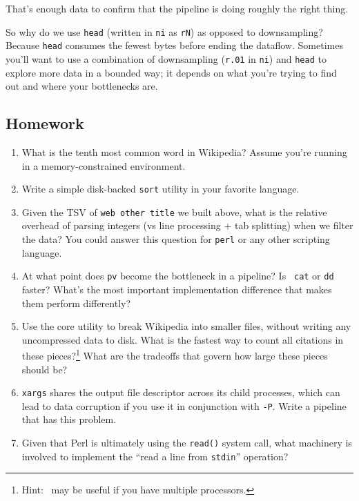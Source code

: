 That's enough data to confirm that the pipeline is doing roughly the right
thing.

So why do we use {\tt head} (written in {\tt ni} as {\tt rN}) as opposed to
downsampling? Because {\tt head} consumes the fewest bytes before ending the
dataflow. Sometimes you'll want to use a combination of downsampling ({\tt r.01}
in {\tt ni}) and {\tt head} to explore more data in a bounded way; it depends on
what you're trying to find out and where your bottlenecks are.

\subsection{Homework}
\begin{enumerate}
  \item What is the tenth most common word in Wikipedia? Assume you're running
        in a memory-constrained environment.
  \item Write a simple disk-backed {\tt sort} utility in your favorite language.
  \item Given the TSV of {\tt web other title} we built above, what is the
        relative overhead of parsing integers (vs line processing + tab
        splitting) when we filter the data? You could answer this question for
        {\tt perl} or any other scripting language.
  \item At what point does {\tt pv} become the bottleneck in a pipeline? Is {\tt
        cat} or {\tt dd} faster? What's the most important implementation
        difference that makes them perform differently?
  \item Use the
        core utility to break Wikipedia into smaller files, without writing any
        uncompressed data to disk. What is the fastest way to count all
        citations in these pieces?\footnote{Hint:~ may be useful if you have multiple processors.} What are the
        tradeoffs that govern how large these pieces should be?
  \item {\tt xargs} shares the output file descriptor across its child
        processes, which can lead to data corruption if you use it in
        conjunction with {\tt -P}. Write a pipeline that has this problem.
  \item Given that Perl is ultimately using the {\tt read()} system call, what
        machinery is involved to implement the ``read a line from {\tt stdin}''
        operation?
\end{enumerate}
